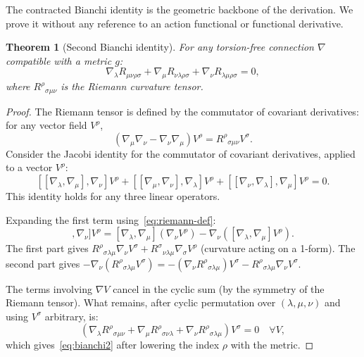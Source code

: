 \documentclass[12pt]{article}
\theoremstyle{plain}
\newtheorem{theorem}{Theorem}[section]
\theoremstyle{definition}
\theoremstyle{remark}
\begin{document}
The contracted Bianchi identity is the geometric backbone of the derivation. We prove it without any reference to an action functional or functional derivative.

\begin{theorem}[Second Bianchi identity]\label{thm:bianchi2}
For any torsion-free connection $\nabla$ compatible with a metric $g$:
\begin{equation}\label{eq:bianchi2}
\nabla_\lambda R_{\mu\nu\rho\sigma} + \nabla_\mu R_{\nu\lambda\rho\sigma} + \nabla_\nu R_{\lambda\mu\rho\sigma} = 0,
\end{equation}
where $R^\rho{}_{\sigma\mu\nu}$ is the Riemann curvature tensor.
\end{theorem}

\begin{proof}
The Riemann tensor is defined by the commutator of covariant derivatives: for any vector field $V^\rho$,
\begin{equation}\label{eq:riemann-def}
(\nabla_\mu\nabla_\nu - \nabla_\nu\nabla_\mu)V^\rho = R^\rho{}_{\sigma\mu\nu}V^\sigma.
\end{equation}
Consider the Jacobi identity for the commutator of covariant derivatives, applied to a vector $V^\rho$:
\begin{equation}\label{eq:jacobi}
[[\nabla_\lambda, \nabla_\mu], \nabla_\nu]V^\rho + [[\nabla_\mu, \nabla_\nu], \nabla_\lambda]V^\rho + [[\nabla_\nu, \nabla_\lambda], \nabla_\mu]V^\rho = 0.
\end{equation}
This identity holds for any three linear operators.

Expanding the first term using~\eqref{eq:riemann-def}:
\begin{equation}
[[\nabla_\lambda, \nabla_\mu], \nabla_\nu]V^\rho = [\nabla_\lambda, \nabla_\mu](\nabla_\nu V^\rho) - \nabla_\nu([\nabla_\lambda, \nabla_\mu]V^\rho).
\end{equation}
The first part gives $R^\rho{}_{\sigma\lambda\mu}\nabla_\nu V^\sigma + R^\sigma{}_{\nu\lambda\mu}\nabla_\sigma V^\rho$ (curvature acting on a 1-form). The second part gives $-\nabla_\nu(R^\rho{}_{\sigma\lambda\mu}V^\sigma) = -(\nabla_\nu R^\rho{}_{\sigma\lambda\mu})V^\sigma - R^\rho{}_{\sigma\lambda\mu}\nabla_\nu V^\sigma$.

The terms involving $\nabla V$ cancel in the cyclic sum (by the symmetry of the Riemann tensor). What remains, after cyclic permutation over $(\lambda, \mu, \nu)$ and using $V^\sigma$ arbitrary, is:
\begin{equation}
(\nabla_\lambda R^\rho{}_{\sigma\mu\nu} + \nabla_\mu R^\rho{}_{\sigma\nu\lambda} + \nabla_\nu R^\rho{}_{\sigma\lambda\mu})V^\sigma = 0 \quad \forall V,
\end{equation}
which gives~\eqref{eq:bianchi2} after lowering the index $\rho$ with the metric.
\end{proof}
\end{document}
